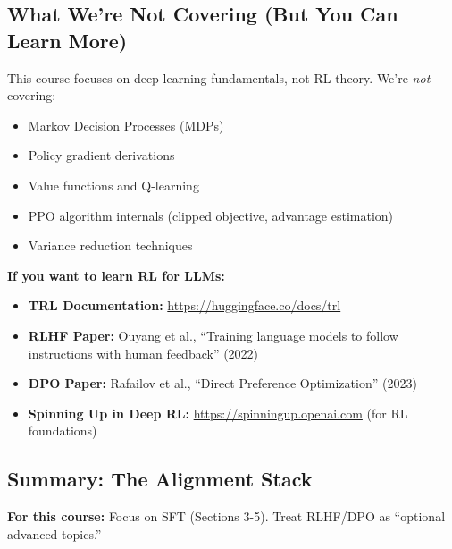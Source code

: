 \documentclass{article}
\begin{document}
\subsection{What We're Not Covering (But You Can Learn More)}

This course focuses on deep learning fundamentals, not RL theory. We're \textit{not} covering:

\begin{itemize}
\item Markov Decision Processes (MDPs)
\item Policy gradient derivations
\item Value functions and Q-learning
\item PPO algorithm internals (clipped objective, advantage estimation)
\item Variance reduction techniques
\end{itemize}

\textbf{If you want to learn RL for LLMs:}
\begin{itemize}
\item \textbf{TRL Documentation:} \url{https://huggingface.co/docs/trl}
\item \textbf{RLHF Paper:} Ouyang et al., ``Training language models to follow instructions with human feedback'' (2022)
\item \textbf{DPO Paper:} Rafailov et al., ``Direct Preference Optimization'' (2023)
\item \textbf{Spinning Up in Deep RL:} \url{https://spinningup.openai.com} (for RL foundations)
\end{itemize}

\subsection{Summary: The Alignment Stack}

\begin{center}
\end{center}

\textbf{For this course:} Focus on SFT (Sections 3-5). Treat RLHF/DPO as ``optional advanced topics.''

\end{document}

